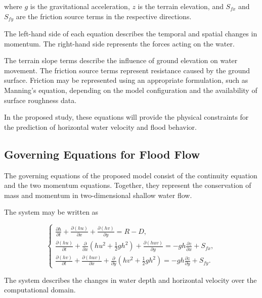 where $g$ is the gravitational acceleration, $z$ is the terrain elevation, and $S_{fx}$ and $S_{fy}$ are the friction source terms in the respective directions.

The left-hand side of each equation describes the temporal and spatial changes in momentum. The right-hand side represents the forces acting on the water.

The terrain slope terms describe the influence of ground elevation on water movement. The friction source terms represent resistance caused by the ground surface. Friction may be represented using an appropriate formulation, such as Manning's equation, depending on the model configuration and the availability of surface roughness data.

In the proposed study, these equations will provide the physical constraints for the prediction of horizontal water velocity and flood behavior.

\subsection{Governing Equations for Flood Flow}


The governing equations of the proposed model consist of the continuity equation and the two momentum equations. Together, they represent the conservation of mass and momentum in two-dimensional shallow water flow.

The system may be written as

\[
\begin{cases}
\displaystyle
\frac{\partial h}{\partial t}
+
\frac{\partial (hu)}{\partial x}
+
\frac{\partial (hv)}{\partial y}
=R-D,\\[1.2em]
\displaystyle
\frac{\partial (hu)}{\partial t}
+
\frac{\partial}{\partial x}
\left(hu^2+\frac{1}{2}gh^2\right)
+
\frac{\partial (huv)}{\partial y}
=-gh\frac{\partial z}{\partial x}+S_{fx},\\[1.2em]
\displaystyle
\frac{\partial (hv)}{\partial t}
+
\frac{\partial (huv)}{\partial x}
+
\frac{\partial}{\partial y}
\left(hv^2+\frac{1}{2}gh^2\right)
=-gh\frac{\partial z}{\partial y}+S_{fy}.
\end{cases}
\]

The system describes the changes in water depth and horizontal velocity over the computational domain.

